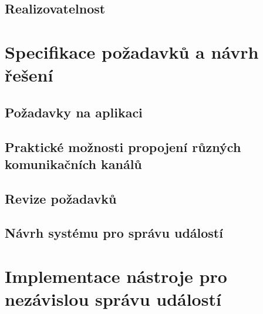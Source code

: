\documentclass[12pt,oneside,final]{fithesis2}
\begin{document}
\section{Realizovatelnost}\label{realizability}



\chapter{Specifikace požadavků a návrh řešení}

\section{Požadavky na aplikaci}

\section{Praktické možnosti propojení různých komunikačních kanálů}

\section{Revize požadavků}

\section{Návrh systému pro správu událostí}




\chapter{Implementace nástroje pro nezávislou správu událostí}
\end{document}
